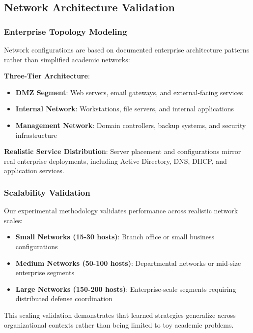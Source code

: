 \subsection{Network Architecture Validation}

\subsubsection{Enterprise Topology Modeling}

Network configurations are based on documented enterprise architecture patterns rather than simplified academic networks:

\textbf{Three-Tier Architecture}:
\begin{itemize}
    \item \textbf{DMZ Segment}: Web servers, email gateways, and external-facing services
    \item \textbf{Internal Network}: Workstations, file servers, and internal applications  
    \item \textbf{Management Network}: Domain controllers, backup systems, and security infrastructure
\end{itemize}

\textbf{Realistic Service Distribution}: Server placement and configurations mirror real enterprise deployments, including Active Directory, DNS, DHCP, and application services.

\subsubsection{Scalability Validation}

Our experimental methodology validates performance across realistic network scales:

\begin{itemize}
    \item \textbf{Small Networks (15-30 hosts)}: Branch office or small business configurations
    \item \textbf{Medium Networks (50-100 hosts)}: Departmental networks or mid-size enterprise segments
    \item \textbf{Large Networks (150-200 hosts)}: Enterprise-scale segments requiring distributed defense coordination
\end{itemize}

This scaling validation demonstrates that learned strategies generalize across organizational contexts rather than being limited to toy academic problems.

